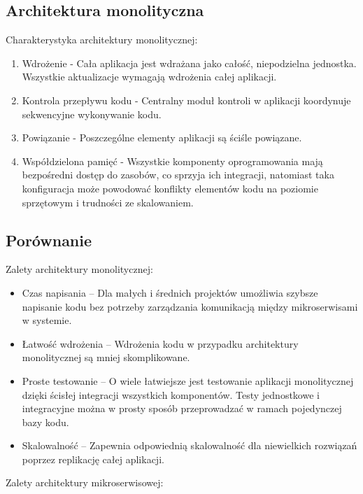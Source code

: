 \documentclass[runningheads,12pt]{llncs}
\begin{document}
\subsection{Architektura monolityczna}

Charakterystyka architektury monolitycznej:

\begin{enumerate}
    \item Wdrożenie - Cała aplikacja jest wdrażana jako całość, niepodzielna jednostka. Wszystkie aktualizacje wymagają wdrożenia całej aplikacji.
    \item Kontrola przepływu kodu - Centralny moduł kontroli w aplikacji koordynuje sekwencyjne wykonywanie kodu.
    \item Powiązanie - Poszczególne elementy aplikacji są ściśle powiązane.
    \item Współdzielona pamięć - Wszystkie komponenty oprogramowania mają bezpośredni dostęp do zasobów, co sprzyja ich integracji, natomiast taka konfiguracja może powodować konflikty elementów kodu na poziomie sprzętowym i trudności ze skalowaniem. \cite{sharma2023monolithic}
\end{enumerate}

\subsection{Porównanie}

Zalety architektury monolitycznej:

\begin{itemize}
    \item Czas napisania – Dla małych i średnich projektów umożliwia szybsze napisanie kodu bez potrzeby zarządzania komunikacją między mikroserwisami w systemie.
    \item Łatwość wdrożenia – Wdrożenia kodu w przypadku architektury monolitycznej są mniej skomplikowane.
    \item Proste testowanie – O wiele łatwiejsze jest testowanie aplikacji monolitycznej dzięki ścisłej integracji wszystkich komponentów. Testy jednostkowe i integracyjne można w prosty sposób przeprowadzać w ramach pojedynczej bazy kodu.
    \item Skalowalność – Zapewnia odpowiednią skalowalność dla niewielkich rozwiązań poprzez replikację całej aplikacji.
\end{itemize}

Zalety architektury mikroserwisowej:
\end{document}
